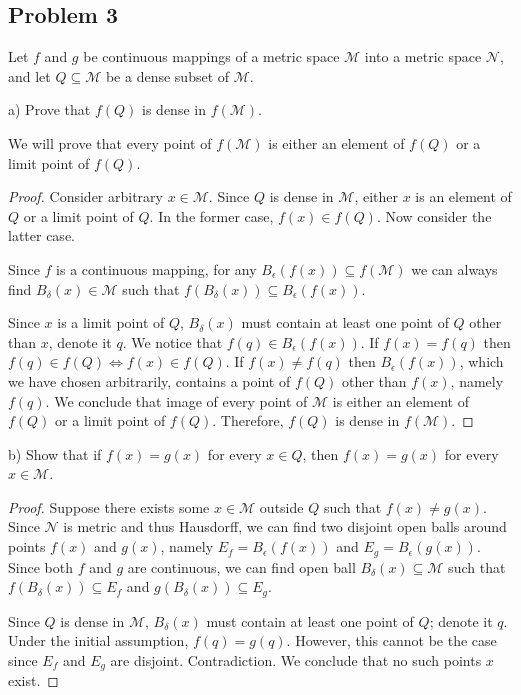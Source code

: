 \documentclass{article}
\begin{document}
\subsection*{Problem 3}

\begin{tcolorbox}
Let $f$ and $g$ be continuous mappings of a metric space $\mathcal{M}$ into a metric space $\mathcal{N}$, and let $Q \subseteq \mathcal{M}$ be a dense subset of $\mathcal{M}$.

a) Prove that $f(Q)$ is dense in $f(\mathcal{M})$.
\end{tcolorbox}

We will prove that every point of $f(\mathcal{M})$ is either an element of $f(Q)$ or a limit point of $f(Q)$.

\begin{proof}

Consider arbitrary $x \in \mathcal{M}$. Since $Q$ is dense in $\mathcal{M}$, either $x$ is an element of $Q$ or a limit point of $Q$. In the former case, $f(x) \in f(Q)$. Now consider the latter case.

Since $f$ is a continuous mapping, for any $B_{\epsilon}(f(x)) \subseteq f(\mathcal{M})$ we can always find $B_{\delta}(x) \in \mathcal{M}$ such that $f (B_{\delta}(x)) \subseteq B_{\epsilon}(f(x))$.

Since $x$ is a limit point of $Q$, $B_{\delta}(x)$ must contain at least one point of $Q$ other than $x$, denote it $q$. We notice that $f(q) \in B_{\epsilon}(f(x))$. If $f(x) = f(q)$ then $f(q) \in f(Q) \iff f(x) \in f(Q)$. If $f(x) \neq f(q)$ then $B_{\epsilon}(f(x))$, which we have chosen arbitrarily, contains a point of $f(Q)$ other than $f(x)$, namely $f(q)$. We conclude that image of every point of $\mathcal{M}$ is either an element of $f(Q)$ or a limit point of $f(Q)$. Therefore, $f(Q)$ is dense in $f(\mathcal{M})$. 

\end{proof}

\begin{tcolorbox}
b) Show that if $f (x) = g (x)$ for every $x \in Q$, then $f (x) = g (x)$ for every $x \in \mathcal{M}$.
\end{tcolorbox}

\begin{proof}
Suppose there exists some $x \in \mathcal{M}$ outside $Q$ such that $f(x) \neq g(x)$. Since $\mathcal{N}$ is metric and thus Hausdorff, we can find two disjoint open balls around points $f(x)$ and $g(x)$, namely $E_f = B_{\epsilon}(f(x))$ and $E_g = B_{\epsilon}(g(x))$. Since both $f$ and $g$ are continuous, we can find open ball $B_{\delta}(x) \subseteq \mathcal{M}$ such that $f (B_{\delta}(x)) \subseteq E_f$ and $g (B_{\delta}(x)) \subseteq E_g$.

Since $Q$ is dense in $\mathcal{M}$, $B_{\delta}(x)$ must contain at least one point of $Q$; denote it $q$. Under the initial assumption, $f(q)=g(q)$. However, this cannot be the case since $E_f$ and $E_g$ are disjoint. Contradiction. We conclude that no such points $x$ exist.

\end{proof}
\end{document}

